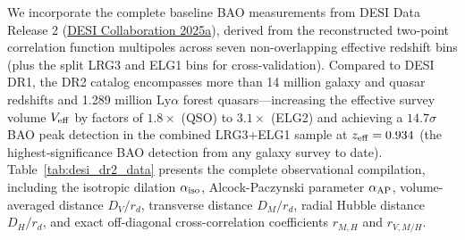 \documentclass[11pt,letterpaper]{article}
\begin{document}
We incorporate the complete baseline BAO measurements from DESI Data Release 2 (\href{https://arxiv.org/abs/2503.14738}{DESI Collaboration 2025a}), derived from the reconstructed two-point correlation function multipoles across seven non-overlapping effective redshift bins (plus the split LRG3 and ELG1 bins for cross-validation). Compared to DESI DR1, the DR2 catalog encompasses more than 14 million galaxy and quasar redshifts and 1.289 million $\text{Ly}\alpha$ forest quasars—increasing the effective survey volume $V_{\rm eff}$ by factors of $1.8\times$ (QSO) to $3.1\times$ (ELG2) and achieving a $14.7\sigma$ BAO peak detection in the combined LRG3+ELG1 sample at $z_{\rm eff} = 0.934$ (the highest-significance BAO detection from any galaxy survey to date). Table~\ref{tab:desi_dr2_data} presents the complete observational compilation, including the isotropic dilation $\alpha_{\rm iso}$, Alcock-Paczynski parameter $\alpha_{\rm AP}$, volume-averaged distance $D_V/r_d$, transverse distance $D_M/r_d$, radial Hubble distance $D_H/r_d$, and exact off-diagonal cross-correlation coefficients $r_{M,H}$ and $r_{V,M/H}$.
\end{document}
